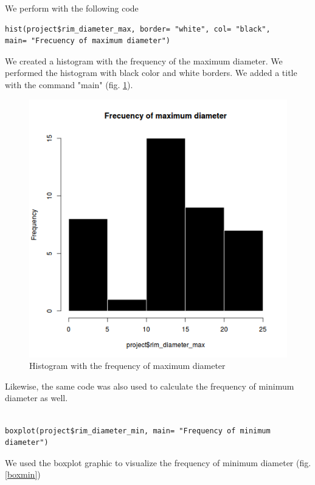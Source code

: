 \documentclass[10pt,a4paper]{article}
\begin{document}
We perform with the following code

\begin{verbatim}
hist(project$rim_diameter_max, border= "white", col= "black", 
main= "Frecuency of maximum diameter")
\end{verbatim}

We created a histogram with the frequency of the maximum diameter. We performed the histogram with black color and white borders. We added a title with the command "main" (fig. \ref{histomax}).

\begin{figure}[htp]
\centering
\includegraphics[scale=0.50]{histomax.png}
\caption{Histogram with the frequency of maximum diameter}
\label{histomax}
\end{figure} 

\newpage

Likewise, the same code was also used to calculate the frequency of minimum diameter as well. 

\begin{verbatim}

boxplot(project$rim_diameter_min, main= "Frequency of minimum diameter")

\end{verbatim}

We used the boxplot graphic to visualize the frequency of minimum diameter (fig. \ref{boxmin})
\end{document}
